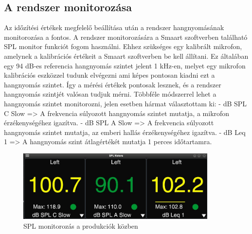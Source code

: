 \subsection{A rendszer monitorozása}
Az időzítési értékek megfelelő beállítása után a rendszer hangnyomásának monitorozása a fontos.
A rendszer monitorozására a Smaart szoftverben található SPL monitor funkciót fogom használni.
Ehhez szükséges egy kalibrált mikrofon, amelynek a kalibrációs értékeit a Smaart szoftverben be kell állítani. 
Ez általában egy 94 dB-es referencia hangnyomás szintet jelent 1 kHz-en, melyet egy mikrofon kalibrációs eszközzel tudunk elvégezni ami képes pontosan kiadni ezt a hangnyomás szintet.
Így a mérési értékek pontosak lesznek, és a rendszer hangnyomás szintjét valósan tudjuk mérni.
Többféle módszerrel lehet a hangnyomás szintet monitorozni, jelen esetben hármat választottam ki:
- dB SPL C Slow => A frekvencia súlyozott hangnyomás szintet mutatja, a mikrofon érzékenységéhez igazítva.
- dB SPL A Slow => A frekvencia súlyozott hangnyomás szintet mutatja, az emberi hallás érzékenységéhez igazítva.
- dB Leq 1 => A hangnyomás szint átlagértékét mutatja 1 perces időtartamra.

\begin{figure}[H]
	\centering
	\includegraphics[width=100mm, keepaspectratio]{figures/smaart_spl_meter.jpg}
	\caption{SPL monitorozás a produkciók közben}\label{fig:smaart_spl_meter}
\end{figure}
